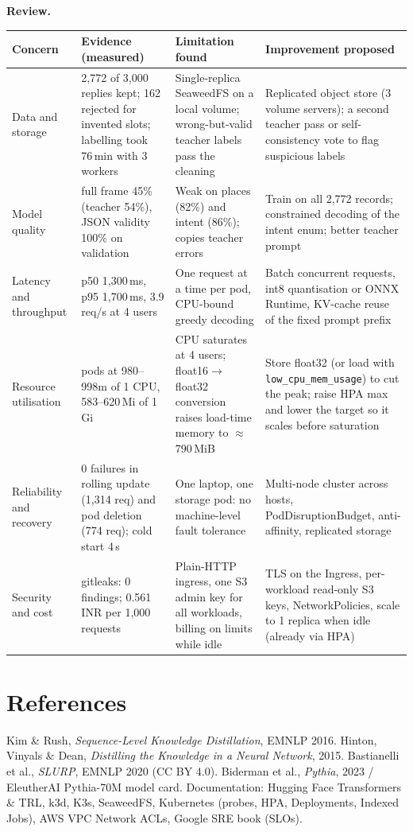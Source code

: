 \documentclass[10pt,a4paper]{article}
\newcommand{\code}[1]{\texttt{\small #1}}
\begin{document}
\textbf{Review.}\\[2pt]
{\small
\begin{tabularx}{\textwidth}{>{\raggedright}p{2.1cm}>{\raggedright}p{3.6cm}>{\raggedright}X>{\raggedright\arraybackslash}X}
\toprule
Concern & Evidence (measured) & Limitation found & Improvement proposed\\
\midrule
Data and storage & 2,772 of 3,000 replies kept; 162 rejected for invented slots; labelling took 76\,min with 3 workers &
Single-replica SeaweedFS on a local volume; wrong-but-valid teacher labels pass the cleaning & Replicated
object store (3 volume servers); a second teacher pass or self-consistency vote to flag suspicious labels\\
Model quality & full frame 45\% (teacher 54\%), JSON validity 100\% on validation & Weak on places (82\%) and
intent (86\%); copies teacher errors & Train on all 2,772 records; constrained decoding of the intent enum;
better teacher prompt\\
Latency and throughput & p50 1,300\,ms, p95 1,700\,ms, 3.9 req/s at 4 users & One request at a time per pod, CPU-bound
greedy decoding & Batch concurrent requests, int8 quantisation or ONNX Runtime, KV-cache reuse of the
fixed prompt prefix\\
Resource utilisation & pods at 980--998m of 1 CPU, 583--620\,Mi of 1\,Gi & CPU saturates at 4 users; float16$\to$float32
conversion raises load-time memory to $\approx$790\,MiB & Store float32 (or load with \code{low\_cpu\_mem\_usage}) to cut
the peak; raise HPA max and lower the target so it scales before
saturation\\
Reliability and recovery & 0 failures in rolling update (1,314 req) and pod deletion (774 req); cold start 4\,s
& One laptop, one storage pod: no machine-level fault tolerance & Multi-node cluster across hosts, PodDisruptionBudget,
anti-affinity, replicated storage\\
Security and cost & gitleaks: 0 findings; 0.561 INR per 1,000 requests & Plain-HTTP ingress, one S3 admin key for
all workloads, billing on limits while idle & TLS on the Ingress, per-workload read-only S3 keys, NetworkPolicies,
scale to 1 replica when idle (already via HPA)\\
\bottomrule
\end{tabularx}}

\section*{References}
{\small Kim \& Rush, \emph{Sequence-Level Knowledge Distillation}, EMNLP 2016.
Hinton, Vinyals \& Dean, \emph{Distilling the Knowledge in a Neural Network}, 2015.
Bastianelli et al., \emph{SLURP}, EMNLP 2020 (CC BY 4.0).
Biderman et al., \emph{Pythia}, 2023 / EleutherAI Pythia-70M model card.
Documentation: Hugging Face Transformers \& TRL, k3d, K3s, SeaweedFS, Kubernetes (probes, HPA, Deployments,
Indexed Jobs), AWS VPC Network ACLs, Google SRE book (SLOs).}
\end{document}
